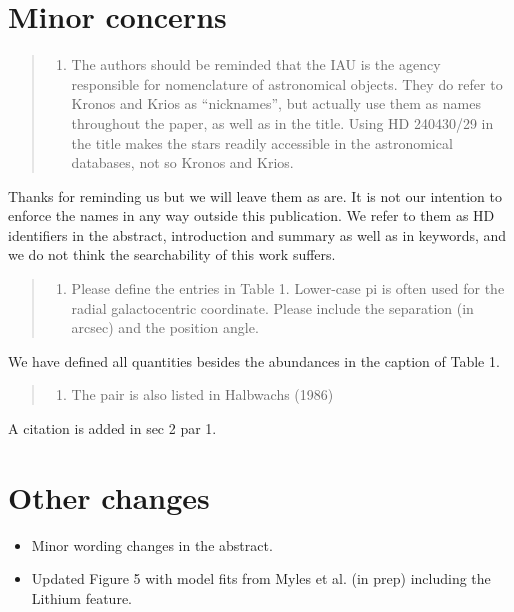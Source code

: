 \documentclass[12pt]{article}
\begin{document}
\section*{Minor concerns}\label{minor-concerns}

\begin{quote}
\begin{enumerate}
\def\labelenumi{\arabic{enumi}.}
\itemsep1pt\parskip0pt
\item
  The authors should be reminded that the IAU is the agency responsible
  for nomenclature of astronomical objects. They do refer to Kronos and
  Krios as ``nicknames'', but actually use them as names throughout the
  paper, as well as in the title. Using HD 240430/29 in the title makes
  the stars readily accessible in the astronomical databases, not so
  Kronos and Krios.
\end{enumerate}
\end{quote}
Thanks for reminding us but we will leave them as are. It is not our intention
to enforce the names in any way outside this publication. We refer to them as HD
identifiers in the abstract, introduction and summary as well as in keywords,
and we do not think the searchability of this work suffers.

\begin{quote}
\begin{enumerate}
\def\labelenumi{\arabic{enumi}.}
\setcounter{enumi}{1}
\itemsep1pt\parskip0pt
\item
  Please define the entries in Table 1. Lower-case pi is often used for
  the radial galactocentric coordinate. Please include the separation
  (in arcsec) and the position angle.
\end{enumerate}
\end{quote}
We have defined all quantities besides the abundances in the caption of Table 1.

\begin{quote}
\begin{enumerate}
\def\labelenumi{\arabic{enumi}.}
\setcounter{enumi}{2}
\itemsep1pt\parskip0pt
\item
  The pair is also listed in Halbwachs (1986)
\end{enumerate}
\end{quote}
A citation is added in sec 2 par 1.

\section*{Other changes}
\label{sec:other}

\begin{itemize}
\item Minor wording changes in the abstract.
\item Updated Figure 5 with model fits from Myles et al. (in prep) including the
  Lithium feature.
\end{itemize}

%

\end{document}
